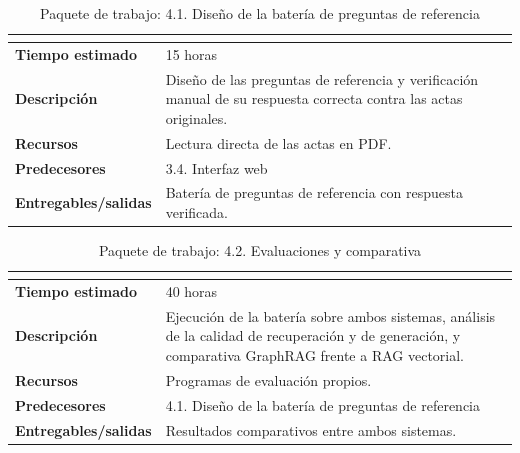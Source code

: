 \documentclass[11pt, a4paper]{report}
\begin{document}
	\begin{table}[H]
		\centering
		\begin{tabularx}{\linewidth}{|>{\bfseries}l|X|}
			\hline
			\rowcolor{pkg-evaluacion}
			\multicolumn{2}{|c|}{\textcolor{white}{\textbf{4.1. Diseño de la batería de preguntas de referencia}}} \\
			\hline
			Tiempo estimado & 15 horas \\
			\hline
			\rowcolor{fila-alterna}
			Descripción & Diseño de las preguntas de referencia y verificación
			manual de su respuesta correcta contra las actas originales. \\
			\hline
			Recursos & Lectura directa de las actas en PDF. \\
			\hline
			\rowcolor{fila-alterna}
			Predecesores & 3.4. Interfaz web \\
			\hline
			Entregables/salidas & Batería de preguntas de referencia con
			respuesta verificada. \\
			\hline
		\end{tabularx}
		\caption{Paquete de trabajo: 4.1. Diseño de la batería de preguntas de referencia}
		\label{tab:pkg-bateria}
	\end{table}

	\begin{table}[H]
		\centering
		\begin{tabularx}{\linewidth}{|>{\bfseries}l|X|}
			\hline
			\rowcolor{pkg-evaluacion}
			\multicolumn{2}{|c|}{\textcolor{white}{\textbf{4.2. Evaluaciones y comparativa}}} \\
			\hline
			Tiempo estimado & 40 horas \\
			\hline
			\rowcolor{fila-alterna}
			Descripción & Ejecución de la batería sobre ambos sistemas, análisis
			de la calidad de recuperación y de generación, y comparativa
			GraphRAG frente a RAG vectorial. \\
			\hline
			Recursos & Programas de evaluación propios. \\
			\hline
			\rowcolor{fila-alterna}
			Predecesores & 4.1. Diseño de la batería de preguntas de referencia \\
			\hline
			Entregables/salidas & Resultados comparativos entre ambos sistemas. \\
			\hline
		\end{tabularx}
		\caption{Paquete de trabajo: 4.2. Evaluaciones y comparativa}
		\label{tab:pkg-comparativa}
	\end{table}
\end{document}
